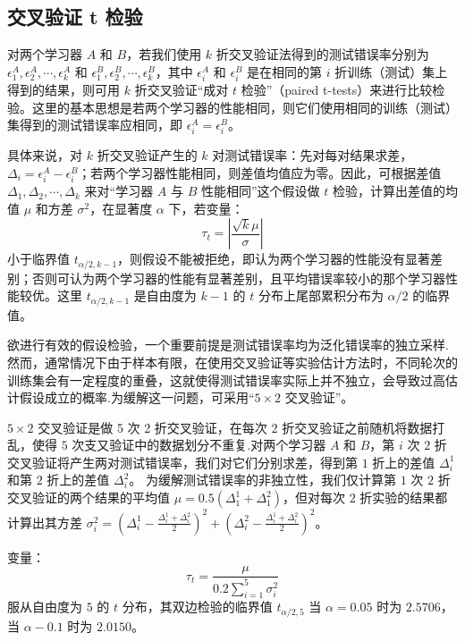 \documentclass[12pt, a4paper]{article} %
\begin{document}
\subsection{交叉验证 t 检验}

对两个学习器 $A$ 和 $B$，若我们使用 $k$ 折交叉验证法得到的测试错误率分别为 $\epsilon_1^A, \epsilon_2^A, \cdots, \epsilon_k^A$ 和 $\epsilon_1^B, \epsilon_2^B, \cdots, \epsilon_k^B$，其中 $\epsilon_i^A$ 和 $\epsilon_i^B$ 是在相同的第 $i$ 折训练（测试）集上得到的结果，则可用 $k$ 折交叉验证“成对 $t$ 检验”（paired t-tests）来进行比较检验。这里的基本思想是若两个学习器的性能相同，则它们使用相同的训练（测试）集得到的测试错误率应相同，即 $\epsilon_i^A = \epsilon_i^B$。

具体来说，对 $k$ 折交叉验证产生的 $k$ 对测试错误率：先对每对结果求差，$\Delta_i = \epsilon_i^A - \epsilon_i^B$；若两个学习器性能相同，则差值均值应为零。因此，可根据差值 $\Delta_1, \Delta_2, \cdots, \Delta_k$ 来对“学习器 $A$ 与 $B$ 性能相同”这个假设做 $t$ 检验，计算出差值的均值 $\mu$ 和方差 $\sigma^2$，在显著度 $\alpha$ 下，若变量：
\begin{equation*}
    \tau_t = \left | \frac{\sqrt{k} \mu}{\sigma} \right | 
\end{equation*}
小于临界值 $t_{\alpha / 2, k - 1}$，则假设不能被拒绝，即认为两个学习器的性能没有显著差别；否则可认为两个学习器的性能有显著差别，且平均错误率较小的那个学习器性能较优。这里 $t_{\alpha / 2, k - 1}$ 是自由度为 $k - 1$ 的 $t$ 分布上尾部累积分布为 $\alpha / 2$ 的临界值。

欲进行有效的假设检验，一个重要前提是测试错误率均为泛化错误率的独立采样.然而，通常情况下由于样本有限，在使用交叉验证等实验估计方法时，不同轮次的训练集会有一定程度的重叠，这就使得测试错误率实际上并不独立，会导致过高估计假设成立的概率.为缓解这一问题，可采用“$5 \times 2$ 交叉验证”。

$5 \times 2$ 交叉验证是做 5 次 2 折交叉验证，在每次 2 折交叉验证之前随机将数据打乱，使得 $5$ 次支又验证中的数据划分不重复.对两个学习器 $A$ 和 $B$，第 $i$ 次 $2$ 折交叉验证将产生两对测试错误率，我们对它们分别求差，得到第 $1$ 折上的差值 $\Delta_i^1$ 和第 $2$ 折上的差值 $\Delta_i^2$。 为缓解测试错误率的非独立性，我们仅计算第 $1$ 次 $2$ 折交叉验证的两个结果的平均值 $\mu = 0.5(\Delta_1^1 + \Delta_1^2)$，但对每次 $2$ 折实验的结果都计算出其方差 $\displaystyle \sigma_i^2 = \left(\Delta_i^1 - \frac{\Delta_i^1 + \Delta_i^2}{2} \right)^2 + \left(\Delta_i^2 - \frac{\Delta_i^1 + \Delta_i^2}{2} \right)^2$。

变量：
\begin{equation*}
    \tau_t = \frac{\mu}{0.2 \sum_{i = 1}^{5} \sigma_i^2}
\end{equation*}
服从自由度为 $5$ 的 $t$ 分布，其双边检验的临界值 $t_{\alpha / 2, 5}$ 当 $\alpha = 0.05$ 时为 $2.5706$，当 $\alpha - 0.1$ 时为 $2.0150$。
\end{document}
